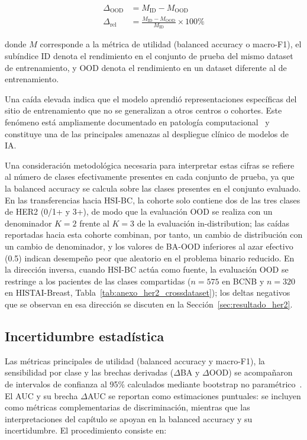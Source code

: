 \begin{align}
    \Delta_{\text{OOD}} &= M_{\text{ID}} - M_{\text{OOD}} \label{eq:delta_ood} \\
    \Delta_{\text{rel}} &= \frac{M_{\text{ID}} - M_{\text{OOD}}}{M_{\text{ID}}} \times 100\% \label{eq:delta_rel}
\end{align}

donde $M$ corresponde a la métrica de utilidad (balanced accuracy o macro-F1), el subíndice ID denota el rendimiento en el conjunto de prueba del mismo dataset de entrenamiento, y OOD denota el rendimiento en un dataset diferente al de entrenamiento.

Una caída elevada indica que el modelo aprendió representaciones específicas del sitio de entrenamiento que no se generalizan a otros centros o cohortes. Este fenómeno está ampliamente documentado en patología computacional~\parencite{huang2025flex, openmibood2025} y constituye una de las principales amenazas al despliegue clínico de modelos de IA.

Una consideración metodológica necesaria para interpretar estas cifras se refiere al número de clases efectivamente presentes en cada conjunto de prueba, ya que la balanced accuracy se calcula sobre las clases presentes en el conjunto evaluado. En las transferencias hacia HSI-BC, la cohorte solo contiene dos de las tres clases de HER2 (0/1+ y 3+), de modo que la evaluación OOD se realiza con un denominador $K=2$ frente al $K=3$ de la evaluación in-distribution; las caídas reportadas hacia esta cohorte combinan, por tanto, un cambio de distribución con un cambio de denominador, y los valores de BA-OOD inferiores al azar efectivo (0.5) indican desempeño peor que aleatorio en el problema binario reducido. En la dirección inversa, cuando HSI-BC actúa como fuente, la evaluación OOD se restringe a los pacientes de las clases compartidas ($n=575$ en BCNB y $n=320$ en HISTAI-Breast, Tabla~\ref{tab:anexo_her2_crossdataset}); los deltas negativos que se observan en esa dirección se discuten en la Sección~\ref{sec:resultado_her2}.

\subsection{Incertidumbre estadística}
\label{sec:incertidumbre}

Las métricas principales de utilidad (balanced accuracy y macro-F1), la sensibilidad por clase y las brechas derivadas ($\Delta$BA y $\Delta$OOD) se acompañaron de intervalos de confianza al 95\% calculados mediante bootstrap no paramétrico~\parencite{riley2025uncertainty}. El AUC y su brecha $\Delta$AUC se reportan como estimaciones puntuales: se incluyen como métricas complementarias de discriminación, mientras que las interpretaciones del capítulo se apoyan en la balanced accuracy y su incertidumbre. El procedimiento consiste en:

